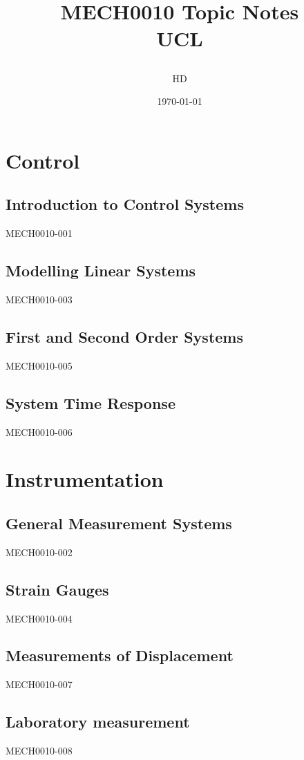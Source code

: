 \documentclass[12pt,a4paper, twoside]{report}
\begin{document}
\title{
  {MECH0010 Topic Notes}\\
  {\large UCL}
  \author{HD}
  \date{\today}
}
\maketitle
\tableofcontents
\part{Control}
\chapter{Introduction to Control Systems}
{MECH0010-001}
\chapter{Modelling Linear Systems}
{MECH0010-003}
\chapter{First and Second Order Systems}
{MECH0010-005}
\chapter{System Time Response}
{MECH0010-006}

\part{Instrumentation}
\chapter{General Measurement Systems}
{MECH0010-002}
\chapter{Strain Gauges}
{MECH0010-004}
\chapter{Measurements of Displacement}
{MECH0010-007}
\chapter{Laboratory measurement}
{MECH0010-008}
\end{document}
